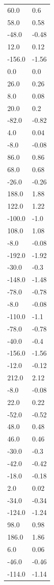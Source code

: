 \begin{longtable}{ll}
60.0 & 0.6 \\
58.0 & 0.58 \\
-48.0 & -0.48 \\
12.0 & 0.12 \\
-156.0 & -1.56 \\
0.0 & 0.0 \\
26.0 & 0.26 \\
8.0 & 0.08 \\
20.0 & 0.2 \\
-82.0 & -0.82 \\
4.0 & 0.04 \\
-8.0 & -0.08 \\
86.0 & 0.86 \\
68.0 & 0.68 \\
-26.0 & -0.26 \\
188.0 & 1.88 \\
122.0 & 1.22 \\
-100.0 & -1.0 \\
108.0 & 1.08 \\
-8.0 & -0.08 \\
-192.0 & -1.92 \\
-30.0 & -0.3 \\
-148.0 & -1.48 \\
-78.0 & -0.78 \\
-8.0 & -0.08 \\
-110.0 & -1.1 \\
-78.0 & -0.78 \\
-40.0 & -0.4 \\
-156.0 & -1.56 \\
-12.0 & -0.12 \\
212.0 & 2.12 \\
-8.0 & -0.08 \\
22.0 & 0.22 \\
-52.0 & -0.52 \\
48.0 & 0.48 \\
46.0 & 0.46 \\
-30.0 & -0.3 \\
-42.0 & -0.42 \\
-18.0 & -0.18 \\
2.0 & 0.02 \\
-34.0 & -0.34 \\
-124.0 & -1.24 \\
98.0 & 0.98 \\
186.0 & 1.86 \\
6.0 & 0.06 \\
-46.0 & -0.46 \\
-114.0 & -1.14 \\

\end{longtable}
